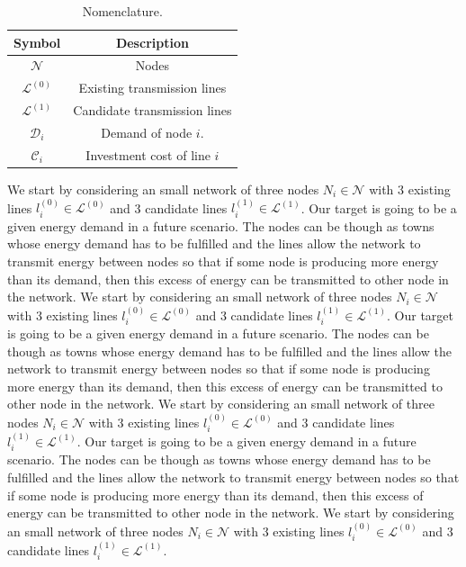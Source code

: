 \begin{table}
\centering
\begin{tabular}{cc} \\\toprule 
 \textbf{Symbol} & \textbf{Description} \\\midrule
 $\mathcal{N}$ & Nodes  \\\midrule
 $\mathcal{L}^{(0)}$ & Existing transmission lines  \\\midrule
  $\mathcal{L}^{(1)}$ & Candidate transmission lines \\\midrule
 $\mathcal{D}_{i}$ & Demand of node $i$. \\\midrule
 $\mathcal{C}_{i}$ & Investment cost of line $i$ \\\bottomrule 
\end{tabular}
\caption{Nomenclature.}
\label{table:TEPNomenclature}
\end{table}
We start by considering an small network of three nodes $N_{i}\in \mathcal{N}$ with 3 existing lines $l_{i}^{(0)}\in \mathcal{L}^{(0)}$ and 3 candidate lines $l_{i}^{(1)}\in \mathcal{L}^{(1)}$. Our target is going to be a given energy demand in a future scenario. The nodes can be though as towns whose energy demand has to be fulfilled and the lines allow the network to transmit energy between nodes so that if some node is producing more energy than its demand, then this excess of energy can be transmitted to other node in the network.
We start by considering an small network of three nodes $N_{i}\in \mathcal{N}$ with 3 existing lines $l_{i}^{(0)}\in \mathcal{L}^{(0)}$ and 3 candidate lines $l_{i}^{(1)}\in \mathcal{L}^{(1)}$. Our target is going to be a given energy demand in a future scenario. The nodes can be though as towns whose energy demand has to be fulfilled and the lines allow the network to transmit energy between nodes so that if some node is producing more energy than its demand, then this excess of energy can be transmitted to other node in the network.
We start by considering an small network of three nodes $N_{i}\in \mathcal{N}$ with 3 existing lines $l_{i}^{(0)}\in \mathcal{L}^{(0)}$ and 3 candidate lines $l_{i}^{(1)}\in \mathcal{L}^{(1)}$. Our target is going to be a given energy demand in a future scenario. The nodes can be though as towns whose energy demand has to be fulfilled and the lines allow the network to transmit energy between nodes so that if some node is producing more energy than its demand, then this excess of energy can be transmitted to other node in the network. We start by considering an small network of three nodes $N_{i}\in \mathcal{N}$ with 3 existing lines $l_{i}^{(0)}\in \mathcal{L}^{(0)}$ and 3 candidate lines $l_{i}^{(1)}\in \mathcal{L}^{(1)}$.
